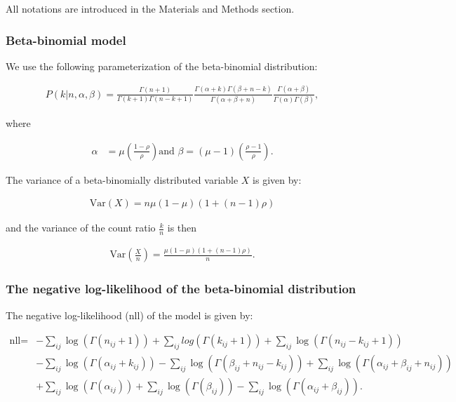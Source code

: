 All notations are introduced in the Materials and Methods section.

\subsubsection*{Beta-binomial model}

We use the following parameterization of the beta-binomial distribution:

\begin{align*}
P(k| n, \alpha, \beta) = \frac{\Gamma(n+1)}{\Gamma(k+1)\Gamma(n-k+1)} 
\frac{\Gamma(\alpha + k)\Gamma(\beta + n - k)}{\Gamma(\alpha + \beta + n)}
\frac{\Gamma(\alpha + \beta)}{\Gamma(\alpha)\Gamma(\beta)},
\end{align*}

where 

\begin{align*}
\alpha &= \mu \left(\frac{1-\rho}{\rho}\right) \text{and } \beta = (\mu - 1)\left(\frac{\rho - 1}{\rho}\right).
\end{align*}

The variance of a beta-binomially distributed variable $X$ is given by:

\begin{align*}
\text{Var}(X) = n \mu (1 - \mu) (1 + (n-1)\rho )
\end{align*}

and the variance of the count ratio $\frac{k}{n}$ is then

\begin{align*}
\text{Var}\left(\frac{X}{n}\right) = \frac{\mu (1 - \mu) (1 + (n-1)\rho )}{n}.
\end{align*}

\subsubsection*{The negative log-likelihood of the beta-binomial distribution}

The negative log-likelihood ($\text{nll}$) of the model is given by:

\begin{align*}
\text{nll}=& - \sum_{ij}\log( \Gamma(n_{ij}+1)) + \sum_{ij}log(\Gamma(k_{ij}+1)) + \sum_{ij}\log(\Gamma(n_{ij}-k_{ij}+1)) \\
&- \sum_{ij}\log(\Gamma(\alpha_{ij}+k_{ij})) - \sum_{ij}\log(\Gamma(\beta_{ij}+n_{ij}-k_{ij})) + \sum_{ij}\log(\Gamma(\alpha_{ij} + \beta_{ij} + n_{ij})) \\
&+ \sum_{ij}\log(\Gamma(\alpha_{ij})) + \sum_{ij}\log(\Gamma(\beta_{ij})) - \sum_{ij}\log(\Gamma(\alpha_{ij} + \beta_{ij})).
\end{align*}


